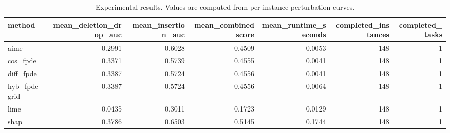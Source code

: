 \begin{table}[t]
\caption{Experimental results. Values are computed from per-instance perturbation curves.}
\label{tab:main_results_computed}
\centering
\begin{tabular}{lrrrrrr}
\toprule
method & mean\_deletion\_drop\_auc & mean\_insertion\_auc & mean\_combined\_score & mean\_runtime\_seconds & completed\_instances & completed\_tasks \\
\midrule
aime & 0.2991 & 0.6028 & 0.4509 & 0.0053 & 148 & 1 \\
cos\_fpde & 0.3371 & 0.5739 & 0.4555 & 0.0041 & 148 & 1 \\
diff\_fpde & 0.3387 & 0.5724 & 0.4556 & 0.0041 & 148 & 1 \\
hyb\_fpde\_grid & 0.3387 & 0.5724 & 0.4556 & 0.0064 & 148 & 1 \\
lime & 0.0435 & 0.3011 & 0.1723 & 0.0129 & 148 & 1 \\
shap & 0.3786 & 0.6503 & 0.5145 & 0.1744 & 148 & 1 \\
\bottomrule
\end{tabular}

\end{table}
